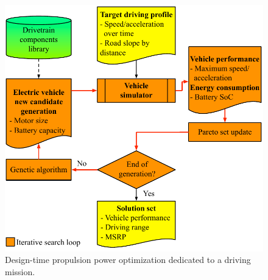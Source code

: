 \begin{figure}
\centering
\includegraphics[width=1.0\hsize]{Figures/Naehyuck_Chang/design_optimization.pdf}
\caption{Design-time propulsion power optimization dedicated to a driving mission.}
\label{fig:design_opt}
\end{figure} 

